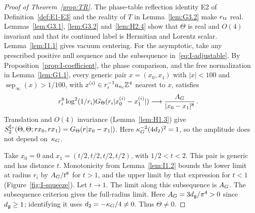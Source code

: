 \begin{proof}[Proof of Theorem~\ref{prop:TR}]
The phase-table reflection identity E2 of Definition~\ref{def:E1-E3} and the reality of $T$ in Lemma~\ref{lem:G3.2} make $e_{\rm tr}$ real. Lemmas~\ref{lem:G3.1}, \ref{lem:G3.2} and~\ref{lem:H2.4} show that $\Theta$ is real and $O(4)$ invariant and that its continued label is Hermitian and Lorentz scalar. Lemma~\ref{lem:I1.1} gives vacuum centering. For the asymptotic, take any prescribed positive null sequence and the subsequence in~\eqref{eq:I-adjustable}. By Proposition~\ref{prop:I-coefficient}, the phase comparison, and the free normalization in Lemma~\ref{lem:G1.1}, every generic pair $x=(x_0,x_1)$ with $|x|<100$ and $\operatorname{sep}_\infty(x)>1/100$, with $x^{(i)}\in r_i^{-1}a_{n_i}\mathbb{Z}^4$ nearest to $x$, satisfies
\begin{equation*}
r_i^8\log^2(1/r_i)G_{\Theta}(r_i|x_0^{(i)}-x_1^{(i)}|)
\longrightarrow\frac{A_G}{|x_0-x_1|^8}\,.
\end{equation*}
Translation and $O(4)$ invariance (Lemma~\ref{lem:H1.3}) give $S_2^{\xi_*}(\Theta,\Theta;rx_0,rx_1)=G_{\Theta}(r|x_0-x_1|)$. Here $\kappa_G^{-2}(4d_2)^2=1$, so the amplitude does not depend on~$\kappa_G$.

Take $x_0=0$ and $x_1=(t/2,t/2,t/2,t/2)$, with $1/2<t<2$. This pair is generic and has distance $t$. Monotonicity from Lemma~\ref{lem:I1.2} bounds the lower limit at radius $r_i$ by $A_G/t^8$ for $t>1$, and the upper limit by that expression for $t<1$ (Figure~\ref{fig:I-squeeze}). Let $t\to1$. The limit along this subsequence is $A_G$. The subsequence criterion gives the full-radius limit. Here $A_G=3d_{\mathfrak{g}}/\pi^4>0$ since $d_{\mathfrak{g}}\ge1$; identifying it uses $d_2=-\kappa_G/4\ne0$. Thus $\Theta\ne0$.
\end{proof}

